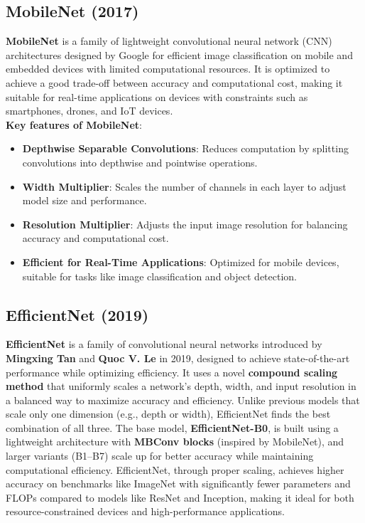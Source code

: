 \subsection{MobileNet (2017)}
\textbf{MobileNet} is a family of lightweight convolutional neural network (CNN) architectures designed by Google for efficient image classification on mobile and embedded devices with limited computational resources. It is optimized to achieve a good trade-off between accuracy and computational cost, making it suitable for real-time applications on devices with constraints such as smartphones, drones, and IoT devices.\cite{howard2017mobilenets}\\

\textbf{Key features of MobileNet}:
\begin{itemize}
    \item \textbf{Depthwise Separable Convolutions}: Reduces computation by splitting convolutions into depthwise and pointwise operations.
    \item \textbf{Width Multiplier}: Scales the number of channels in each layer to adjust model size and performance.
    \item \textbf{Resolution Multiplier}: Adjusts the input image resolution for balancing accuracy and computational cost.
    \item \textbf{Efficient for Real-Time Applications}: Optimized for mobile devices, suitable for tasks like image classification and object detection.
\end{itemize}

\subsection{EfficientNet (2019)}
\textbf{EfficientNet} is a family of convolutional neural networks introduced by \textbf{Mingxing Tan} and \textbf{Quoc V. Le} in 2019, designed to achieve state-of-the-art performance while optimizing efficiency. It uses a novel \textbf{compound scaling method} that uniformly scales a network's depth, width, and input resolution in a balanced way to maximize accuracy and efficiency. Unlike previous models that scale only one dimension (e.g., depth or width), EfficientNet finds the best combination of all three. The base model, \textbf{EfficientNet-B0}, is built using a lightweight architecture with \textbf{MBConv blocks} (inspired by MobileNet), and larger variants (B1–B7) scale up for better accuracy while maintaining computational efficiency. EfficientNet, through proper scaling, achieves higher accuracy on benchmarks like ImageNet with significantly fewer parameters and FLOPs compared to models like ResNet and Inception, making it ideal for both resource-constrained devices and high-performance applications.\cite{efficientnet}\\

